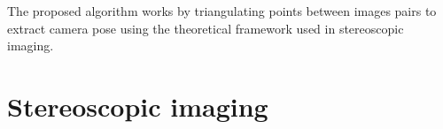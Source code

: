 \documentclass{osa-article}
\begin{document}
The proposed algorithm works by triangulating points between images pairs to extract camera pose using the theoretical framework used in stereoscopic imaging.

%


\section{Stereoscopic imaging}
\end{document}

